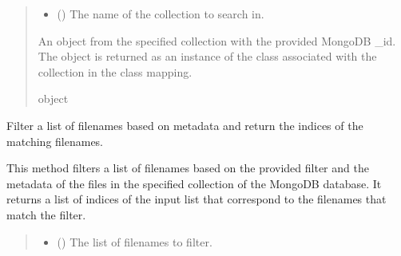 \documentclass[letterpaper,10pt,english]{sphinxmanual}
\begin{document}
\begin{fulllineitems}
\begin{fulllineitems}
\begin{quote}
\begin{description}
\begin{itemize}
\item {} 
\sphinxAtStartPar
{} () \textendash{} The name of the collection to search in.

\end{itemize}

\sphinxAtStartPar
An object from the specified collection with the provided MongoDB \_id. The object is
returned as an instance of the class associated with the collection in the class mapping.

\sphinxAtStartPar
object

\end{description}\end{quote}

\end{fulllineitems}


\begin{fulllineitems}
\label{\detokenize{forensicfit.database.database:forensicfit.database.database.Database.filter_with_metadata}}
\pysigstartsignatures
{}
\pysigstopsignatures
\sphinxAtStartPar
Filter a list of filenames based on metadata and return the indices of the matching filenames.

\sphinxAtStartPar
This method filters a list of filenames based on the provided filter and the metadata of the
files in the specified collection of the MongoDB database. It returns a list of indices of the
input list that correspond to the filenames that match the filter.
\begin{quote}\begin{description}
\sphinxAtStartPar
\sphinxcode{\sphinxupquote{List}}{[}\sphinxcode{\sphinxupquote{int}}{]}

\begin{itemize}
\item {} 
\sphinxAtStartPar
{} (\sphinxstyleliteralemphasis{\sphinxupquote{{[}}}\sphinxstyleliteralemphasis{\sphinxupquote{{]}}}) \textendash{} The list of filenames to filter.


\end{itemize}
\end{description}
\end{quote}
\end{fulllineitems}
\end{fulllineitems}
\end{document}
